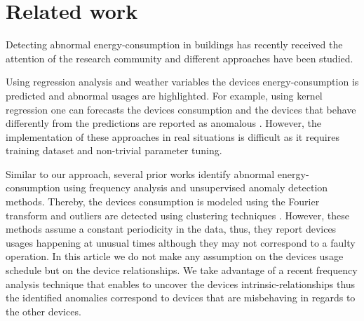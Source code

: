 \section{Related work}
Detecting abnormal energy-consumption in buildings has recently received the attention of the research community and different approaches have been studied.


Using regression analysis and weather variables the devices energy-consumption is predicted and abnormal usages are highlighted.
For example, using kernel regression one can forecasts the devices consumption and the devices that behave differently from the predictions are reported as anomalous \cite{brown:buildperf2012}.
However, the implementation of these approaches in real situations is difficult as it requires training dataset and non-trivial parameter tuning.

Similar to our approach, several prior works identify abnormal energy-consumption using frequency analysis and unsupervised anomaly detection methods.
Thereby, the devices consumption is modeled using the Fourier transform and outliers are detected using clustering techniques \cite{Bellala_buildsys11,wrinch:pes2012,jakkula,chen:aaaiw2011}.
However, these methods assume a constant periodicity in the data, thus, they report devices usages happening at unusual times although they may not correspond to a faulty operation.
In this article we do not make any assumption on the devices usage schedule but on the device relationships.
We take advantage of a recent frequency analysis technique that enables to uncover the devices intrinsic-relationships \cite{romain:iotapp12} thus the identified anomalies correspond to devices that are misbehaving in regards to the other devices.

% 
% 
% 
% 

